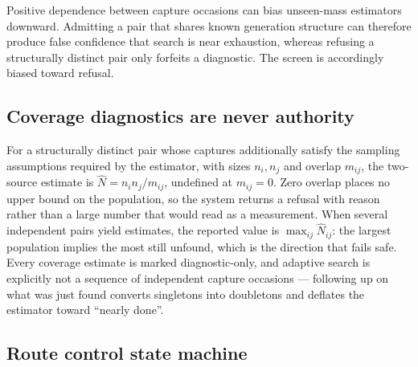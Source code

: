\begin{proposition}
\label{prop:conservative}
Positive dependence between capture occasions can bias unseen-mass estimators
downward. Admitting a pair that shares known generation structure can therefore
produce false confidence that search is near exhaustion, whereas refusing a
structurally distinct pair only forfeits a diagnostic. The screen is accordingly
biased toward refusal.
\end{proposition}

\subsection{Coverage diagnostics are never authority}

For a structurally distinct pair whose captures additionally satisfy the
sampling assumptions required by the estimator, with sizes $n_i, n_j$ and
overlap $m_{ij}$,
the two-source estimate is $\hat{N} = n_i n_j / m_{ij}$, undefined at
$m_{ij}=0$. Zero overlap places no upper bound on the population, so the system
returns a refusal with reason rather than a large number that would read as a
measurement. When several independent pairs yield estimates, the reported value
is $\max_{ij} \hat{N}_{ij}$: the largest population implies the most still
unfound, which is the direction that fails safe. Every coverage estimate is
marked diagnostic-only, and adaptive search is explicitly not a sequence of
independent capture occasions --- following up on what was just found converts
singletons into doubletons and deflates the estimator toward ``nearly done''.

\subsection{Route control state machine}

